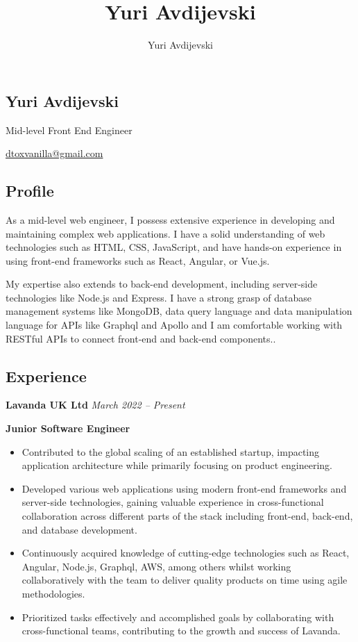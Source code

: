 \documentclass[11pt, oneside]{article}
\title{Yuri Avdijevski}
\author{Yuri Avdijevski}
\begin{document}
\begin{center}
\section*{Yuri Avdijevski}
Mid-level Front End Engineer

\href{dtoxvanilla@gmail.com}{dtoxvanilla@gmail.com}
\end{center}

\subsection*{Profile}

As a mid-level web engineer, I possess extensive experience in developing and maintaining complex web applications. I have a solid understanding of web technologies such as HTML, CSS, JavaScript, and have hands-on experience in using front-end frameworks such as React, Angular, or Vue.js.

My expertise also extends to back-end development, including server-side technologies like Node.js and Express. I have a strong grasp of database management systems like MongoDB, data query language and data manipulation language for APIs like Graphql and Apollo and I am comfortable working with RESTful APIs to connect front-end and back-end components..

\medskip
\subsection*{Experience}

\textbf{Lavanda UK Ltd}
\hfill
\textit{March 2022 – Present}

\textbf{Junior Software Engineer}

\begin{itemize}
  \item Contributed to the global scaling of an established startup, impacting application architecture while primarily focusing on product engineering.
  \item Developed various web applications using modern front-end frameworks and server-side technologies, gaining valuable experience in cross-functional collaboration across different parts of the stack including front-end, back-end, and database development.
  \item Continuously acquired knowledge of cutting-edge technologies such as React, Angular, Node.js, Graphql, AWS, among others whilst working collaboratively with the team to deliver quality products on time using agile methodologies.
  \item Prioritized tasks effectively and accomplished goals by collaborating with cross-functional teams, contributing to the growth and success of Lavanda.
\end{itemize}
\end{document}

